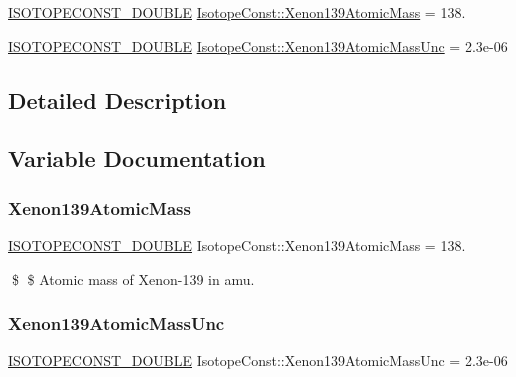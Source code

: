 \begin{DoxyCompactItemize}
\item 
\mbox{\hyperlink{group___isotope_const-_macros_ga8f45a7272ce02c0b4c65c44636ed719a}{I\+S\+O\+T\+O\+P\+E\+C\+O\+N\+S\+T\+\_\+\+D\+O\+U\+B\+LE}} \mbox{\hyperlink{group___isotope_const-_xenon-_xe139_gab66ebc86c1905b66a1c4b27136a0fc1a}{Isotope\+Const\+::\+Xenon139\+Atomic\+Mass}} = 138.
\item 
\mbox{\hyperlink{group___isotope_const-_macros_ga8f45a7272ce02c0b4c65c44636ed719a}{I\+S\+O\+T\+O\+P\+E\+C\+O\+N\+S\+T\+\_\+\+D\+O\+U\+B\+LE}} \mbox{\hyperlink{group___isotope_const-_xenon-_xe139_gaf4a019c5c7124cc99c9d9a618d5213dc}{Isotope\+Const\+::\+Xenon139\+Atomic\+Mass\+Unc}} = 2.\+3e-\/06
\end{DoxyCompactItemize}


\subsection{Detailed Description}


\subsection{Variable Documentation}
\mbox{\label{group___isotope_const-_xenon-_xe139_gab66ebc86c1905b66a1c4b27136a0fc1a}} 
\subsubsection{\texorpdfstring{Xenon139\+Atomic\+Mass}{Xenon139AtomicMass}}
{\footnotesize\ttfamily \mbox{\hyperlink{group___isotope_const-_macros_ga8f45a7272ce02c0b4c65c44636ed719a}{I\+S\+O\+T\+O\+P\+E\+C\+O\+N\+S\+T\+\_\+\+D\+O\+U\+B\+LE}} Isotope\+Const\+::\+Xenon139\+Atomic\+Mass = 138.}

\$ \$ Atomic mass of Xenon-\/139 in amu. \mbox{\label{group___isotope_const-_xenon-_xe139_gaf4a019c5c7124cc99c9d9a618d5213dc}} 
\subsubsection{\texorpdfstring{Xenon139\+Atomic\+Mass\+Unc}{Xenon139AtomicMassUnc}}
{\footnotesize\ttfamily \mbox{\hyperlink{group___isotope_const-_macros_ga8f45a7272ce02c0b4c65c44636ed719a}{I\+S\+O\+T\+O\+P\+E\+C\+O\+N\+S\+T\+\_\+\+D\+O\+U\+B\+LE}} Isotope\+Const\+::\+Xenon139\+Atomic\+Mass\+Unc = 2.\+3e-\/06}

